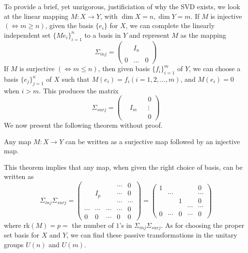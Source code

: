  To provide a brief, yet unrigorous, justificiation of why the SVD exists, we look at the linear mapping $M: X \longrightarrow Y$, with $\dim{X} = n, \dim{Y} = m$. If $M$ is injective $(\iff m \geq n)$, given the basis $\{e_i\}$ for $X$, we can complete the linearly independent set $\{Me_i\}_{i=1}^n$ to a basis in $Y$ and represent $M$ as the mapping
  \begin{equation}
    \Sigma_{inj} = \begin{pmatrix} &&\\ &I_n&\\ &&\\ 0&\ldots &0 \end{pmatrix}
  \end{equation}
  If $M$ is surjective $(\iff m \leq n)$, then given basis $\{f_i\}_{i=1}^m$ of $Y$, we can choose a basis $\{e_j\}_{j=1}^n$ of $X$ such that $M(e_i) = f_i (i = 1, 2, \ldots, m)$, and $M(e_i) = 0$ when $i > m$. This produces the matrix
  \begin{equation}
    \Sigma_{surj} = \begin{pmatrix} &&&0\\&I_m&& \vdots \\&&&0\end{pmatrix}
  \end{equation}
  We now present the following theorem without proof. 

  \begin{theorem}
    Any map $M: X \longrightarrow Y$ can be written as a surjective map followed by an injective map. 
  \end{theorem}

  This theorem implies that any map, when given the right choice of basis, can be written as 
  \begin{equation}
    \Sigma_{inj} \Sigma_{surj} = \begin{pmatrix}
    &&&\cdots&0\\
    &I_p&&\cdots&0\\
    &&&\cdots&\cdots\\
    \cdots&\cdots&\cdots&\cdots&0\\
    0&0&\cdots&0&0
    \end{pmatrix} = \begin{pmatrix}
    1&&&&0\\
    &\cdots&&&\cdots\\
    &&1&&0\\
    &&&\cdots&\cdots\\
    0&\cdots&0&\cdots&0
    \end{pmatrix}
  \end{equation}
  where rk$(M) = p = $ the number of $1$'s in $\Sigma_{inj} \Sigma_{surj}$. As for choosing the proper set basis for $X$ and $Y$, we can find these passive transformations in the unitary groups $U(n)$ and $U(m)$. 

